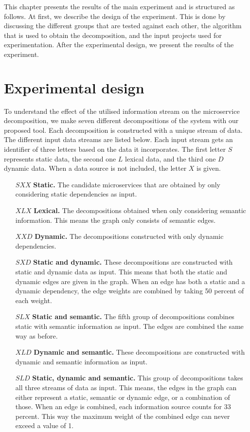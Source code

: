 This chapter presents the results of the main experiment and is structured as follows. At first, we describe the design of the experiment. This is done by discussing the different groups that are tested against each other, the algorithm that is used to obtain the decomposition, and the input projects used for experimentation. After the experimental design, we present the results of the experiment. 

\section{Experimental design}
To understand the effect of the utilised information stream on the microservice decomposition, we make seven different decompositions of the system with our proposed tool. Each decomposition is constructed with a unique stream of data. The different input data streams are listed below. Each input stream gets an identifier of three letters based on the data it incorporates. The first letter $S$ represents static data, the second one $L$ lexical data, and the third one $D$ dynamic data. When a data source is not included, the letter $X$ is given.

\begin{itemize}
    \item[$SXX$] \textbf{Static.} The candidate microservices that are obtained by only considering static dependencies as input.
    \item[$XLX$] \textbf{Lexical.} The decompositions obtained when only considering semantic information. This means the graph only consists of semantic edges.
    \item[$XXD$] \textbf{Dynamic.} The decompositions constructed with only dynamic dependencies.
    \item[$SXD$] \textbf{Static and dynamic.} These decompositions are constructed with static and dynamic data as input. This means that both the static and dynamic edges are given in the graph. When an edge has both a static and a dynamic dependency, the edge weights are combined by taking 50 percent of each weight.
    \item[$SLX$] \textbf{Static and semantic.} The fifth group of decompositions combines static with semantic information as input. The edges are combined the same way as before.
    \item[$XLD$] \textbf{Dynamic and semantic.} These decompositions are constructed with dynamic and semantic information as input.
    \item[$SLD$] \textbf{Static, dynamic and semantic.} This group of decompositions takes all three streams of data as input. This means, the edges in the graph can either represent a static, semantic or dynamic edge, or a combination of those. When an edge is combined, each information source counts for 33 percent. This way the maximum weight of the combined edge can never exceed a value of 1. 
\end{itemize}


